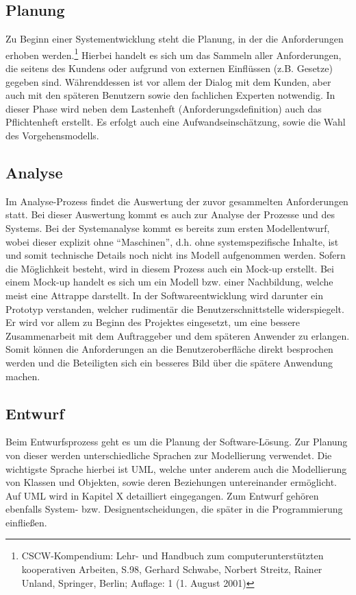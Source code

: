 \subsection{Planung}

Zu Beginn einer Systementwicklung steht die Planung, in der die Anforderungen erhoben werden.\footnote{CSCW-Kompendium: Lehr- und Handbuch zum computerunterstützten kooperativen Arbeiten, S.98,  Gerhard Schwabe, Norbert Streitz, Rainer Unland, Springer, Berlin; Auflage: 1 (1. August 2001)}
Hierbei handelt es sich um das Sammeln aller Anforderungen, die seitens des Kundens oder aufgrund von externen Einflüssen (z.B. Gesetze) gegeben sind.
Währenddessen ist vor allem der Dialog mit dem Kunden, aber auch mit den späteren Benutzern sowie den fachlichen Experten notwendig.
In dieser Phase wird neben dem Lastenheft (Anforderungsdefinition) auch das Pflichtenheft erstellt. Es erfolgt auch eine Aufwandseinschätzung, sowie die Wahl des Vorgehensmodells.\\

\subsection{Analyse}

Im Analyse-Prozess findet die Auswertung der zuvor gesammelten Anforderungen statt.
Bei dieser Auswertung kommt es auch zur Analyse der Prozesse und des Systems.
Bei der Systemanalyse kommt es bereits zum ersten Modellentwurf, wobei dieser explizit ohne “Maschinen”, d.h. ohne systemspezifische Inhalte, ist und somit technische Details noch nicht ins Modell aufgenommen werden.
Sofern die Möglichkeit besteht, wird in diesem Prozess auch ein Mock-up erstellt.
Bei einem Mock-up handelt es sich um ein Modell bzw. einer Nachbildung, welche meist eine Attrappe darstellt.
In der Softwareentwicklung wird darunter ein Prototyp verstanden, welcher rudimentär die Benutzerschnittstelle widerspiegelt.
Er wird vor allem zu Beginn des Projektes eingesetzt, um eine bessere Zusammenarbeit mit dem Auftraggeber und dem späteren Anwender zu erlangen.
Somit können die Anforderungen an die Benutzeroberfläche direkt besprochen werden und die Beteiligten sich ein besseres Bild über die spätere Anwendung machen.\\

\subsection{Entwurf}

Beim Entwurfsprozess geht es um die Planung der Software-Lösung. Zur Planung von dieser werden unterschiedliche Sprachen zur Modellierung verwendet. Die wichtigste Sprache hierbei ist UML, welche unter anderem auch die Modellierung von Klassen und Objekten, sowie deren Beziehungen untereinander ermöglicht. Auf UML wird in Kapitel X detailliert eingegangen.
Zum Entwurf gehören ebenfalls System- bzw. Designentscheidungen, die später in die Programmierung einfließen.

